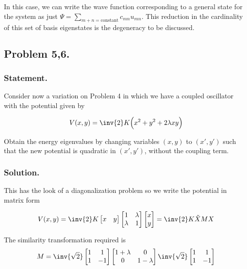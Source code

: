 In this case, we can write the wave function corresponding to a general state for the system as just $\Psi = \sum_{m+ n = \text{constant}} c_{mn} u_{mn}$.  This reduction in the cardinality of this set of basis eigenstates is the degeneracy to be discussed.

\subsection{Problem 5,6.}
\subsubsection{Statement.}

Consider now a variation on Problem 4 in which we have a coupled oscillator with the potential given by

\begin{align}\label{eqn:desaiCh9:500}
V(x,y) = \inv{2} K \Bigl( x^2 + y^2 + 2 \lambda x y \Bigr)
\end{align}

Obtain the energy eigenvalues by changing variables $(x,y)$ to $(x', y')$ such that the new potential is quadratic in $(x', y')$, without the coupling term.

\subsubsection{Solution.}

This has the look of a diagonalization problem so we write the potential in matrix form

\begin{align}\label{eqn:desaiCh9:501}
V(x,y) 
= \inv{2} K 
\begin{bmatrix}
x & y
\end{bmatrix}
\begin{bmatrix}
1 & \lambda \\
\lambda & 1 
\end{bmatrix}
\begin{bmatrix}
x \\ y
\end{bmatrix} = \inv{2} K \tilde{X} M X
\end{align}

The similarity transformation required is
\begin{align}\label{eqn:desaiCh9:502}
M = \inv{\sqrt{2}}
\begin{bmatrix}
1 & 1 \\
1 & -1
\end{bmatrix}
\begin{bmatrix}
1+ \lambda & 0 \\
0 & 1 - \lambda
\end{bmatrix}
\inv{\sqrt{2}}
\begin{bmatrix}
1 & 1 \\
1 & -1
\end{bmatrix}
\end{align}

